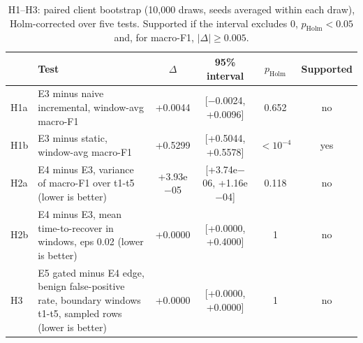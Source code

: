\begin{table}[t]
\centering
\caption{H1--H3: paired client bootstrap (10{,}000 draws, seeds averaged within each draw), Holm-corrected over five tests. Supported if the interval excludes 0, $p_\mathrm{Holm} < 0.05$ and, for macro-F1, $|\Delta| \geq 0.005$.}
\label{tab:hypotheses}
\begin{tabular}{llcccc}
\toprule
 & Test & $\Delta$ & 95\% interval & $p_\mathrm{Holm}$ & Supported \\
\midrule
H1a & E3 minus naive incremental, window-avg macro-F1 & +0.0044 & [$-$0.0024, +0.0096] & 0.652 & no \\
H1b & E3 minus static, window-avg macro-F1 & +0.5299 & [+0.5044, +0.5578] & $<10^{-4}$ & yes \\
H2a & E4 minus E3, variance of macro-F1 over t1-t5 (lower is better) & +3.93e$-$05 & [+3.74e$-$06, +1.16e$-$04] & 0.118 & no \\
H2b & E4 minus E3, mean time-to-recover in windows, eps 0.02 (lower is better) & +0.0000 & [+0.0000, +0.4000] & 1 & no \\
H3 & E5 gated minus E4 edge, benign false-positive rate, boundary windows t1-t5, sampled rows (lower is better) & +0.0000 & [+0.0000, +0.0000] & 1 & no \\
\bottomrule
\end{tabular}
\end{table}

